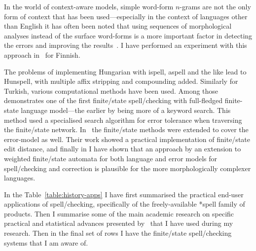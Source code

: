 \documentclass[officiallayout]{unihelcompling}
\begin{document}
In the world of context-aware models, simple word-form \(n\)-grams are not the only
form of context that has been used---especially in the context of languages
other than English it has often been noted that using sequences of
morphological analyses instead of the surface word-forms is a more important
factor in detecting the errors and improving the results~\citep[for
Spanish]{otero2007contextual}. I have performed an experiment with this
approach in~ for Finnish.

The problems of implementing Hungarian with ispell, aspell and the like lead to
Hunspell, with multiple affix stripping and compounding added. Similarly for
Turkish, various computational methods have been used. Among
those~\citet{oflazer1996errortolerant} demonstrates one of the first
finite\-/state spell\-/checking with full-fledged finite-state language
model---the earlier by \citep{aho1975efficient} being more of a keyword search.
This method used a specialised search algorithm for error tolerance when
traversing the finite\-/state network.  In~\citet{agata2002typographical} the
finite\-/state methods were extended to cover the error-model as well. Their work
showed a practical implementation of finite\-/state edit distance, and finally in
 I have shown that an approach by an
extension to weighted finite\-/state automata for both language and error models
for spell\-/checking and correction is plausible for the more morphologically
complexer languages.


In the Table~\ref{table:history-apps} I have first summarised the practical
end-user applications of spell\-/checking, specifically of the freely-available
*spell family of products. Then I summarise some of the main academic research
on specific practical and statistical advances presented
by~\citet{al2006learning} that I have used during my research. Then in the
final set of rows I have the finite\-/state spell\-/checking systems that I am
aware of.
\end{document}

